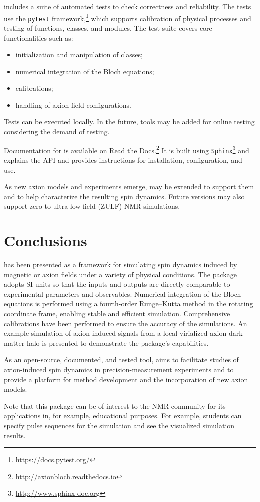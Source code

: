 \axionbloch{} includes a suite of automated tests to check correctness and reliability. 
The tests use the \texttt{pytest} framework,\footnote{\url{https://docs.pytest.org/}} which supports calibration of physical processes and testing of functions, classes, and modules. 
The test suite covers core functionalities such as:
\begin{itemize}
    \item initialization and manipulation of classes; 
    \item numerical integration of the Bloch equations;
    \item calibrations;
    \item handling of axion field configurations.
\end{itemize}
Tests can be executed locally. 
In the future, tools may be added for online testing considering the demand of testing. 

Documentation for \axionbloch{} is available on Read the Docs.\footnote{\url{http://axionbloch.readthedocs.io}}
It is built using \texttt{Sphinx}\footnote{\url{http://www.sphinx-doc.org}} and explains the API and provides instructions for installation, configuration, and use.

As new axion models and experiments emerge, \axionbloch{} may be extended to support them and to help characterize the resulting spin dynamics. 
Future versions may also support zero-to-ultra-low-field (ZULF) NMR simulations. 

\section{Conclusions}
\label{sec:conclusions}

\axionbloch{} has been presented as a framework for simulating spin dynamics induced by magnetic or axion fields under a variety of physical conditions. 
The package adopts SI units so that the inputs and outputs are directly comparable to experimental parameters and observables. 
Numerical integration of the Bloch equations is performed using a fourth-order Runge--Kutta method in the rotating coordinate frame, enabling stable and efficient simulation. 
Comprehensive calibrations have been performed to ensure the accuracy of the simulations.
An example simulation of axion-induced signals from a local virialized axion dark matter halo is presented to demonstrate the package's capabilities. 

As an open-source, documented, and tested tool, \axionbloch{} aims to facilitate studies of axion-induced spin dynamics in precision-measurement experiments and to provide a platform for method development and the incorporation of new axion models.

Note that this package can be of interest to the NMR community for its applications in, for example, educational purposes. 
For example, students can specify pulse sequences for the simulation and see the visualized simulation results. 
